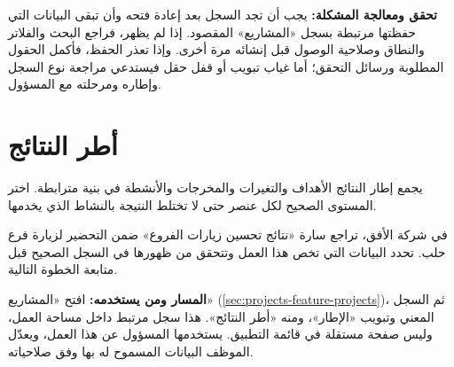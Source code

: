 \textbf{تحقق ومعالجة المشكلة:} يجب أن تجد السجل بعد إعادة فتحه وأن تبقى البيانات التي حفظتها مرتبطة بسجل «المشاريع» المقصود. إذا لم يظهر، فراجع البحث والفلاتر والنطاق وصلاحية الوصول قبل إنشائه مرة أخرى. وإذا تعذر الحفظ، فأكمل الحقول المطلوبة ورسائل التحقق؛ أما غياب تبويب أو قفل حقل فيستدعي مراجعة نوع السجل وإطاره ومرحلته مع المسؤول.

\clearpage
\section{أطر النتائج}
\label{sec:projects-feature-logframes}

يجمع إطار النتائج الأهداف والتغيرات والمخرجات والأنشطة في بنية مترابطة. اختر المستوى الصحيح لكل عنصر حتى لا تختلط النتيجة بالنشاط الذي يخدمها.

\begin{rcnote}
في شركة الأفق، تراجع سارة «نتائج تحسين زيارات الفروع» ضمن التحضير لزيارة فرع حلب. تحدد البيانات التي تخص هذا العمل وتتحقق من ظهورها في السجل الصحيح قبل متابعة الخطوة التالية.
\end{rcnote}

\textbf{المسار ومن يستخدمه:} افتح «المشاريع» (\ref{sec:projects-feature-projects})، ثم السجل المعني وتبويب «الإطار»، ومنه «أطر النتائج». هذا سجل مرتبط داخل مساحة العمل، وليس صفحة مستقلة في قائمة التطبيق. يستخدمها المسؤول عن هذا العمل، ويعدّل الموظف البيانات المسموح له بها وفق صلاحياته.

